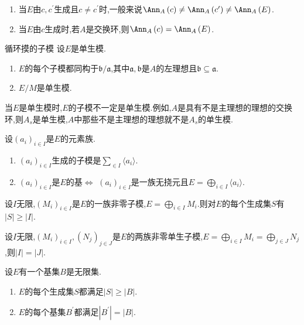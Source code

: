 \begin{remark}{}{}
	\begin{enumerate}
		\item 当$E$由$c,c^{\prime}$生成且$c\neq c^{\prime}$时,一般来说$\Ann_{A}\left(c\right)\neq\Ann_{A}\left(c^{\prime}\right)\neq\Ann_{A}\left(E\right)$.
		\item 当$E$由$c$生成时,若$A$是交换环,则$\Ann_{A}\left(c\right)=\Ann_{A}\left(E\right)$.
	\end{enumerate}
\end{remark}

\begin{corollary}{循环摸的子模}{}
	设$E$是单生模.
	\begin{enumerate}
		\item $E$的每个子模都同构于$\mathfrak{b}/\mathfrak{a}$,其中$\mathfrak{a},\mathfrak{b}$是$A$的左理想且$\mathfrak{b}\subseteq\mathfrak{a}$.
		\item $E/M$是单生模.
	\end{enumerate}
\end{corollary}

\begin{remark}{}{}
	当$E$是单生模时,$E$的子模不一定是单生模.例如,$A$是具有不是主理想的理想的交换环,则$A_{s}$是单生模,$A$中那些不是主理想的理想就不是$A_{s}$的单生模.
\end{remark}

\begin{proposition}{}{}
	设$\left(a_{i}\right)_{i\in I}$是$E$的元素族.
	\begin{enumerate}
		\item $\left(a_{i}\right)_{i\in I}$生成的子模是$\sum\limits_{\in I}\langle a_{i}\rangle$.
		\item $\left(a_{i}\right)_{i\in I}$是$E$的基$\iff$ $\left(a_{i}\right)_{i\in I}$是一族无挠元且$E=\bigoplus\limits_{i\in I}\langle a_{i}\rangle$.
	\end{enumerate}
\end{proposition}

\begin{proposition}{}{}
	设$I$无限,$\left(M_{i}\right)_{i\in I}$是$E$的一族非零子模,$E=\bigoplus\limits_{i\in I}M_{i}$.则对$E$的每个生成集$S$有$\left|S\right|\geq\left|I\right|$.
\end{proposition}

\begin{corollary}{}{}
	设$I$无限,$\left(M_{i}\right)_{i\in I},\left(N_{j}\right)_{j\in J}$是$E$的两族非零单生子模,$E=\bigoplus\limits_{i\in I}M_{i}=\bigoplus\limits_{j\in J}N_{j}$,则$\left|I\right|=\left|J\right|$.
\end{corollary}

\begin{corollary}{}{}
	设$E$有一个基集$B$是无限集.
	\begin{enumerate}
		\item $E$的每个生成集$S$都满足$\left|S\right|\geq\left|B\right|$.
		\item $E$的每个基集$B^{\prime}$都满足$\left|B^{\prime}\right|=\left|B\right|$.
	\end{enumerate}
\end{corollary}




